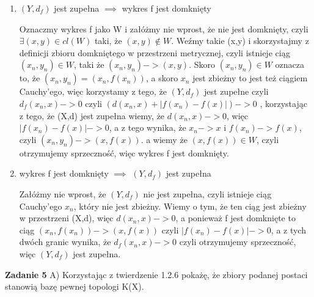 \documentclass[12pt,a4paper]{article}
\newcommand{\zadanie}[1]{\par\textbf{Zadanie #1}}
\begin{document}
\begin{enumerate}
    \item $(Y,d_f)$ jest zupełna $\implies$ wykres f jest domknięty
    
    Oznaczmy wykres f jako W i załóżmy nie wprost, że nie jest domknięty, czyli $\exists (x,y) \in cl(W)$ taki, że $(x,y) \notin W$. Weźmy takie (x,y) i skorzystajmy z definicji zbioru domkniętego w przestrzeni metrycznej, czyli istnieje  ciąg $(x_n,y_n) \in W$, taki że $(x_n, y_n) -> (x,y)$. Skoro $(x_n, y_n) \in W$ oznacza to, że $(x_n, y_n) = (x_n, f(x_n))$, a skoro $x_n$ jest zbieżny  to jest też ciągiem Cauchy'ego, więc korzystamy z tego, że $(Y,d_f)$ jest zupełne czyli $d_f(x_n,x) -> 0$ czyli $(d(x_n, x) + |f(x_n) - f(x)|)-> 0$ , korzystając z tego, że (X,d) jest zupełna wiemy, że $d(x_n,x) -> 0$, więc $|f(x_n) - f(x)| -> 0$, a z tego wynika, że $x_n - > x$ i $f(x_n) -> f(x)$, czyli $(x_n, y_n) -> (x,f(x))$. a wiemy że $(x, f(x)) \in W$, czyli otrzymujemy sprzeczność, więc wykres f jest domknięty.
    
    \item wykres f jest domknięty $\implies$ $(Y,d_f)$ jest zupełna
    
    Załóżmy nie wprost, że $(Y,d_f)$ nie jest zupełna, czyli istnieje ciąg Cauchy'ego $x_n$, który nie jest zbieżny. Wiemy o tym, że ten ciąg jest zbieżny w przestrzeni (X,d), więc $d(x_n, x) -> 0$, a ponieważ f jest domknięte to ciąg $(x_n,f(x_n)) -> (x, f(x))$ czyli $|f(x_n) - f(x)| -> 0$, a z tych dwóch granic wynika, że $d_f(x_n, x) -> 0$ czyli otrzymujemy sprzeczność, więc $(Y,d_f)$ jest zupełna.
\end{enumerate}
\zadanie{5}
A) Korzystając z twierdzenie 1.2.6 pokażę, że zbiory podanej postaci stanowią bazę pewnej topologi K(X).
\end{document}
